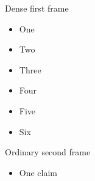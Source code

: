 \documentclass[11pt,aspectratio=169]{beamer}
\begin{document}
\begin{frame}{Dense first frame}
  \begin{itemize}
    \item One
    \item Two
    \item Three
    \item Four
    \item Five
    \item Six
  \end{itemize}
\end{frame}
\begin{frame}{Ordinary second frame}
  \begin{itemize}\item One claim\end{itemize}
\end{frame}
\end{document}
